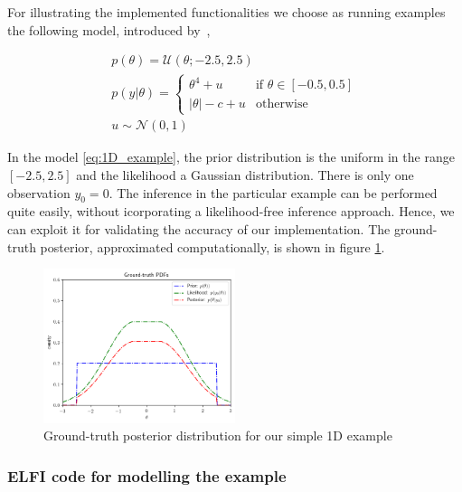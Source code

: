 For illustrating the implemented functionalities we choose as running
examples the following model, introduced by~\autocite{Ikonomov2019},

\begin{gather} \label{eq:1D_example}
  p(\theta) = \mathcal{U}(\theta;-2.5,2.5)\\
  p(y|\theta) = 
  \left\{
    \begin{array}{ll}
      \theta^4 + u & \mbox{if } \theta \in [-0.5, 0.5] \\
      |\theta| - c + u & \mbox{otherwise} 
    \end{array} \right.\\
  u \sim \mathcal{N}(0,1)
\end{gather}

\noindent

In the model \eqref{eq:1D_example}, the prior distribution is the
uniform in the range $[-2.5, 2.5]$ and the likelihood a Gaussian
distribution. There is only one observation $y_0 = 0$. The inference
in the particular example can be performed quite easily, without
icorporating a likelihood-free inference approach. Hence, we can
exploit it for validating the accuracy of our implementation. The
ground-truth posterior, approximated computationally, is shown in
figure \ref{fig:example_gt}.

\begin{figure}[h]
    \begin{center}
      \includegraphics[width=0.5\textwidth]{./Thesis/images/chapter3/example_gt.png}
    \end{center}
  \caption{Ground-truth posterior distribution for our simple 1D example}
  \label{fig:example_gt}
\end{figure}

\subsubsection*{ELFI code for modelling the example}

